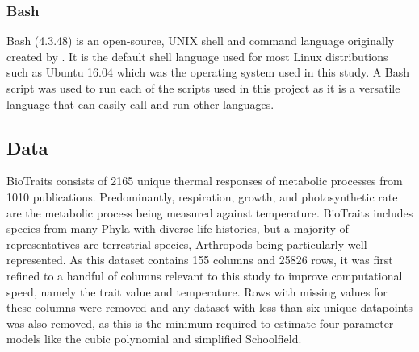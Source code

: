\documentclass[twoside,twocolumn,11pt]{article}
\begin{document}
\subsubsection{Bash}
Bash (4.3.48) is an open-source, UNIX shell and command language originally created by \cite{Fox1989}. It is the default 
shell language used for most Linux distributions such as Ubuntu 16.04 which was the operating system used in this study. 
A Bash script was used to run each of the scripts used in this project as it is a versatile language that can easily 
call and run other languages.

\subsection{Data}
BioTraits consists of 2165 unique thermal responses of metabolic 
processes from 1010 publications. Predominantly, respiration, growth, and photosynthetic
rate are the metabolic process being measured against temperature. BioTraits includes species from many 
Phyla with diverse life histories, but a majority of representatives are terrestrial
species, Arthropods being particularly well-represented. 
As this dataset contains 155 columns and 25826 rows, it was first refined to a handful
of columns relevant to this study to improve computational speed, namely the trait value and temperature.
Rows with missing values for these columns were removed and any dataset with less than six unique
datapoints was also removed, as this is the minimum required to estimate four parameter models like the cubic
polynomial and simplified Schoolfield. 
\end{document}

